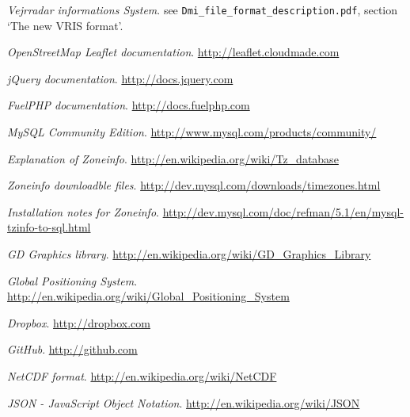 \renewcommand\bibname{References}

\begin{thebibliography}{10}
\emph{Vejrradar informations System}.
see \texttt{Dmi\_file\_format\_description.pdf}, section `The new VRIS format'.

\emph{OpenStreetMap Leaflet documentation}.
\url{http://leaflet.cloudmade.com}

\emph{jQuery documentation}.
\url{http://docs.jquery.com}

\emph{FuelPHP documentation}.
\url{http://docs.fuelphp.com}

\emph{MySQL Community Edition}.
\url{http://www.mysql.com/products/community/}

\emph{Explanation of Zoneinfo}.
\url{http://en.wikipedia.org/wiki/Tz_database}

\emph{Zoneinfo downloadble files}.
\url{http://dev.mysql.com/downloads/timezones.html}

\emph{Installation notes for Zoneinfo}.
\url{http://dev.mysql.com/doc/refman/5.1/en/mysql-tzinfo-to-sql.html}

\emph{GD Graphics library}.
\url{http://en.wikipedia.org/wiki/GD_Graphics_Library}

\emph{Global Positioning System}.
\url{http://en.wikipedia.org/wiki/Global_Positioning_System}

\emph{Dropbox}.
\url{http://dropbox.com}

\emph{GitHub}.
\url{http://github.com}

\emph{NetCDF format}.
\url{http://en.wikipedia.org/wiki/NetCDF}

\emph{JSON - JavaScript Object Notation}.
\url{http://en.wikipedia.org/wiki/JSON}
\end{thebibliography}
